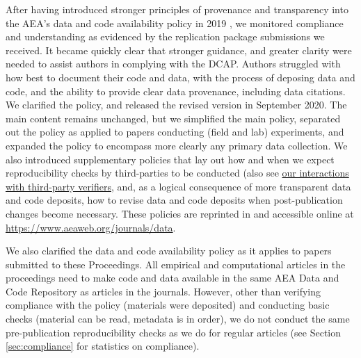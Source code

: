 \documentclass[PP]{AEA}
\begin{document}
After having introduced stronger principles of provenance and transparency into the  \ac{AEA}'s data and code availability policy in 2019 \citep{10.1257/pandp.110.dcap}, we monitored compliance and understanding as evidenced by the replication package submissions we received. It became quickly clear that stronger guidance, and greater clarity were needed to assist authors in complying with the \ac{DCAP}. Authors struggled with how best to document their code and data,  with the process of deposing data and code, and the ability to provide clear data provenance, including  data citations. We clarified the policy, and released the revised version in September 2020. The main content remains unchanged, but we simplified the main policy,  separated out the policy as applied to papers conducting (field and lab) experiments, and expanded the policy to encompass more clearly any primary data collection. We also introduced  supplementary policies that lay out how and when we expect reproducibility checks by third-parties to be conducted (also see \hyperref[sec:3rdparty]{our interactions with third-party verifiers}, and, as a logical consequence of more transparent data and code deposits, how to revise data and code deposits when post-publication changes become necessary. These policies are reprinted in \citet{10.1257/pandp.111.dcap} and accessible online at \url{https://www.aeaweb.org/journals/data}.

We also clarified the data and code availability policy as it applies to papers submitted to these Proceedings. All empirical and computational articles in the proceedings need to make code and data available in the same AEA Data and Code Repository as articles in the journals. However, other than verifying compliance with the policy (materials were deposited) and conducting basic checks (material can be read, metadata is in order), we do not conduct the same pre-publication reproducibility checks as we do for regular articles (see Section \ref{sec:compliance} for statistics on compliance).
\end{document}
